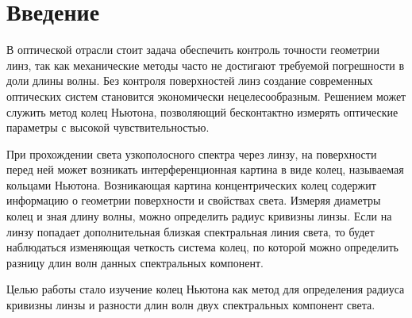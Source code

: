 \chapter{Введение}
\label{ch:intro}

В оптической отрасли стоит задача обеспечить контроль точности геометрии линз, так как механические методы часто не достигают требуемой погрешности в доли длины волны. Без контроля поверхностей линз создание современных оптических систем становится экономически нецелесообразным. Решением может служить метод колец Ньютона, позволяющий бесконтактно измерять оптические параметры с высокой чувствительностью.

При прохождении света узкополосного спектра через линзу, на поверхности перед ней может возникать интерференционная картина в виде колец, называемая кольцами Ньютона. Возникающая картина концентрических колец содержит информацию о геометрии поверхности и свойствах света. Измеряя диаметры колец и зная длину волны, можно определить радиус кривизны линзы. Если на линзу попадает дополнительная близкая спектральная линия света, то будет наблюдаться изменяющая четкость система колец, по которой можно определить разницу длин волн данных спектральных компонент.

Целью работы стало изучение колец Ньютона как метод для определения радиуса кривизны линзы и разности длин волн двух спектральных компонент света.
